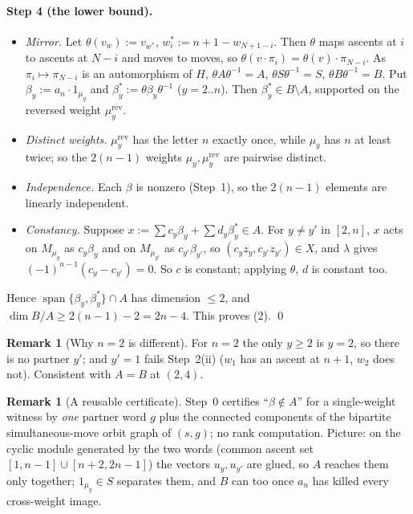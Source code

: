 \documentclass[11pt]{amsart}
\theoremstyle{plain}
\theoremstyle{definition}
\newtheorem{remark}[theorem]{Remark}
\begin{document}
\paragraph{Step 4 (the lower bound).}
\begin{itemize}[leftmargin=1.2em,itemsep=1pt]
\item \emph{Mirror.} Let $\theta(v_w):=v_{w^*}$, $w^*_i:=n+1-w_{N+1-i}$. Then $\theta$ maps ascents at $i$ to ascents at $N-i$ and moves to moves, so $\theta(v\cdot\pi_i)=\theta(v)\cdot\pi_{N-i}$. As $\pi_i\mapsto\pi_{N-i}$ is an automorphism of $H$, $\theta A\theta^{-1}=A$, $\theta S\theta^{-1}=S$, $\theta B\theta^{-1}=B$. Put $\beta_y:=a_n\cdot1_{\mu_y}$ and $\beta^*_y:=\theta\beta_y\theta^{-1}$ ($y=2..n$). Then $\beta^*_y\in B\setminus A$, supported on the reversed weight $\mu_y^{\mathrm{rev}}$.
\item \emph{Distinct weights.} $\mu_y^{\mathrm{rev}}$ has the letter $n$ exactly once, while $\mu_y$ has $n$ at least twice; so the $2(n-1)$ weights $\mu_y,\mu_y^{\mathrm{rev}}$ are pairwise distinct.
\item \emph{Independence.} Each $\beta$ is nonzero (Step~1), so the $2(n-1)$ elements are linearly independent.
\item \emph{Constancy.} Suppose $x:=\sum c_y\beta_y+\sum d_y\beta^*_y\in A$. For $y\ne y'$ in $[2,n]$, $x$ acts on $M_{\mu_y}$ as $c_y\beta_y$ and on $M_{\mu_{y'}}$ as $c_{y'}\beta_{y'}$, so $(c_yz_y,c_{y'}z_{y'})\in X$, and $\lambda$ gives $(-1)^{n-1}(c_y-c_{y'})=0$. So $c$ is constant; applying $\theta$, $d$ is constant too.
\end{itemize}
Hence $\operatorname{span}\{\beta_y,\beta^*_y\}\cap A$ has dimension $\le2$, and $\dim B/A\ge2(n-1)-2=2n-4$. This proves (2). \qed

\begin{remark}[Why $n=2$ is different]
For $n=2$ the only $y\ge2$ is $y=2$, so there is no partner $y'$; and $y'=1$ fails Step~2(ii) ($w_1$ has an ascent at $n+1$, $w_2$ does not). Consistent with $A=B$ at $(2,4)$.
\end{remark}

\begin{remark}[A reusable certificate]
Step~0 certifies ``$\beta\notin A$'' for a single-weight witness by \emph{one} partner word $g$ plus the connected components of the bipartite simultaneous-move orbit graph of $(s,g)$; no rank computation. Picture: on the cyclic module generated by the two words (common ascent set $[1,n-1]\cup[n+2,2n-1]$) the vectors $u_y,u_{y'}$ are glued, so $A$ reaches them only together; $1_{\mu_y}\in S$ separates them, and $B$ can too once $a_n$ has killed every cross-weight image.
\end{remark}
\end{document}
